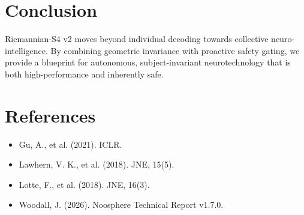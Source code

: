 \documentclass[11pt,a4paper]{article}
\begin{document}
\section{Conclusion}
Riemannian-S4 v2 moves beyond individual decoding towards collective neuro-intelligence. By combining geometric invariance with proactive safety gating, we provide a blueprint for autonomous, subject-invariant neurotechnology that is both high-performance and inherently safe.

\section{References}
\begin{itemize}
    \item Gu, A., et al. (2021). ICLR.
    \item Lawhern, V. K., et al. (2018). JNE, 15(5).
    \item Lotte, F., et al. (2018). JNE, 16(3).
    \item Woodall, J. (2026). Noosphere Technical Report v1.7.0.
\end{itemize}
\end{document}
